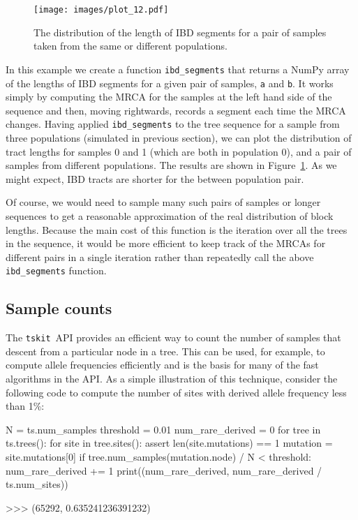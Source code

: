 \documentclass[graybox]{svmult}
\newcommand{\tskit}[0]{\texttt{tskit}}
\begin{document}
\begin{figure}
\begin{center}
\texttt{[image: images/plot\_12.pdf]}
\end{center}
\caption{\label{fig:ibd_segments} The distribution of the length of IBD
segments for a pair of samples taken from the same or different populations.}
\end{figure}

In this example we create a function \texttt{ibd\_segments} that returns
a NumPy array of the lengths of IBD segments for a given pair of
samples, \texttt{a} and \texttt{b}. It works simply by computing the
MRCA for the samples at the left hand side of the sequence and then,
moving rightwards, records a segment each time the MRCA changes. Having 
applied \texttt{ibd\_segments} to the tree sequence for a sample from three populations (simulated in previous section),
we can plot the distribution of tract lengths for samples 0 and 1 (which are
both in population 0), and a pair of
samples from different populations. The results are shown in
Figure~\ref{fig:ibd_segments}. As we might expect, IBD tracts
are shorter for the between population pair.

Of course, we would need to sample many such pairs of samples or longer sequences to
get a reasonable approximation of the real distribution of block lengths.
Because the main cost of this function is the iteration over all the
trees in the sequence, it would be more efficient to keep track of the MRCAs
for different pairs in a single iteration rather than repeatedly
call the above \texttt{ibd\_segments} function.

\subsection{Sample counts}\label{sample-counts}

The \tskit\ API provides an efficient way to count the number of samples that
descent from  a particular node in a tree. This can be used,
for example, to compute allele frequencies efficiently and is the basis
for many of the fast algorithms in the API. As a simple illustration of
this technique, consider the following code to compute the number of
sites with derived allele frequency less than 1\%:

\begin{pythoncode}
N = ts.num_samples
threshold = 0.01
num_rare_derived = 0
for tree in ts.trees():
    for site in tree.sites():
        assert len(site.mutations) == 1
        mutation = site.mutations[0]
        if tree.num_samples(mutation.node) / N < threshold:
            num_rare_derived += 1
print((num_rare_derived, num_rare_derived / ts.num_sites))

>>> (65292, 0.635241236391232)
\end{pythoncode}
\end{document}
